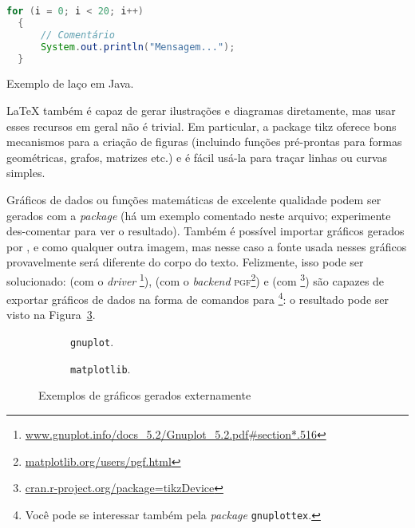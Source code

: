 
\begin{program}
  \centering

\begin{lstlisting}[language=Java, style=wider]
  for (i = 0; i < 20; i++)
  {
      // Comentário
      System.out.println("Mensagem...");
  }
\end{lstlisting}

  \caption{Exemplo de laço em Java.\label{prog:java}}
\end{program}


\LaTeX{} também é capaz de gerar ilustrações e diagramas diretamente, mas
usar esses recursos em geral não é trivial. Em particular, a package
\textsf{tikz} oferece bons mecanismos para a criação de figuras (incluindo
funções pré-prontas para formas geométricas, grafos, matrizes etc.) e é
fácil usá-la para traçar linhas ou curvas simples.

Gráficos de dados ou funções matemáticas de excelente qualidade podem ser
gerados com a \textit{package}  (há um exemplo comentado neste
arquivo; experimente des-comentar para ver o resultado). Também é possível
importar gráficos gerados por ,  e 
como qualquer outra imagem, mas nesse caso a fonte usada nesses gráficos
provavelmente será diferente do corpo do texto. Felizmente, isso pode ser
solucionado:  (com o \emph{driver} \footnote{
\url{www.gnuplot.info/docs\_5.2/Gnuplot\_5.2.pdf\#section*.516}}),
 (com o \emph{backend} \textsc{pgf}\footnote{
\url{matplotlib.org/users/pgf.html}}) e  (com
\footnote{\url{cran.r-project.org/package=tikzDevice}})
são capazes de exportar gráficos de
dados na forma de comandos para \footnote{Você pode se interessar
também pela \textit{package} \texttt{gnuplottex}.}: o resultado pode ser
visto na Figura~\ref{fig:graficos}.

\begin{figure}
  \centering
  \begin{subfigure}[b]{.45\textwidth}
    \caption{\texttt{gnuplot}.\label{fig:gnuplot}}
  \end{subfigure}
  \begin{subfigure}[b]{.5\textwidth}
    
    \caption{\texttt{matplotlib}.\label{fig:matplotlib}}
  \end{subfigure}
  \caption{Exemplos de gráficos gerados externamente}\label{fig:graficos}
\end{figure}

